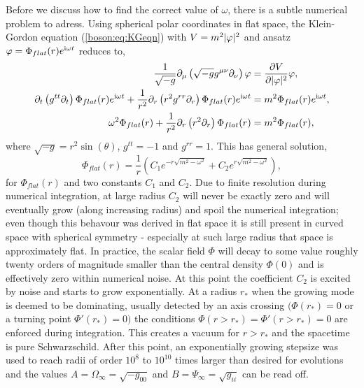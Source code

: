  Before we discuss how to find the correct value of $\omega$, there is a subtle numerical problem to adress. Using spherical polar coordinates in flat space, the Klein-Gordon equation (\ref{boson:eq:KGeqn}) with $V=m^2 |\varphi|^2$ and ansatz $\varphi =\Phi_{flat}(r)e^{\mathrm{i}\omega t}$ reduces to,
\begin{align}
\frac{1}{\sqrt{-g}} \partial_\mu \left(\sqrt{-g} g^{\mu\nu} \partial_\nu \right)\varphi &= \frac{\partial V}{\partial |\varphi|^2} \varphi ,\\
 \partial_t \left( g^{tt} \partial_t \right)\Phi_{flat}(r)e^{\mathrm{i} \omega t} + \frac{1}{r^2} \partial_r \left(r^2 g^{rr} \partial_r \right)\Phi_{flat}(r)e^{\mathrm{i} \omega t} &= m^2 \Phi_{flat}(r)e^{\mathrm{i} \omega t} ,\\
  \omega^2 \Phi_{flat}(r) + \frac{1}{r^2} \partial_r \left(r^2  \partial_r \right)\Phi_{flat}(r) &= m^2 \Phi_{flat}(r) ,\\
\end{align}
where $\sqrt{-g} = r^2 \sin(\theta)$, $g^{tt}=-1$ and $g^{rr}=1$. This has general solution,
\begin{equation}
\Phi_{flat}(r) = \frac{1}{r}\left(C_1 e^{- r \sqrt{m^2-\omega^2}} + C_2 e^{ r \sqrt{m^2-\omega^2}} \right),
\end{equation}
for $\Phi_{flat}(r)$ and two constants $C_1$ and $C_2$. Due to finite resolution during numerical integration, at large radius $C_2$ will never be exactly zero and will eventually grow (along increasing radius) and spoil the numerical integration; even though this behavour was derived in flat space it is still present in curved space with spherical symmetry - especially at such large radius that space is approximately flat. In practice, the scalar field $\Phi$ will decay to some value roughly twenty orders of magnitude smaller than the central density $\Phi(0)$ and is effectively zero within numerical noise. At this point the coefficient $C_2$ is excited by noise and starts to grow exponentially. At a radius $r_*$ when the growing mode is deemed to be dominating, usually detected by an axis crossing $(\Phi(r_*)=0$ or a turning point $\Phi'(r_*)=0)$ the conditions $\Phi(r>r_*)=\Phi'(r>r_*)=0$ are enforced during integration. This creates a vacuum for $r>r_*$ and the spacetime is pure Schwarzschild. After this point, an exponentially growing stepsize was used to reach radii of order $10^8$ to $10^{10}$ times larger than desired for evolutions and the values $A = \Omega_\infty= \sqrt{-g_{00}}$ and $B=\Psi_{\infty}=\sqrt{g_{ii}}$ can be read off.

